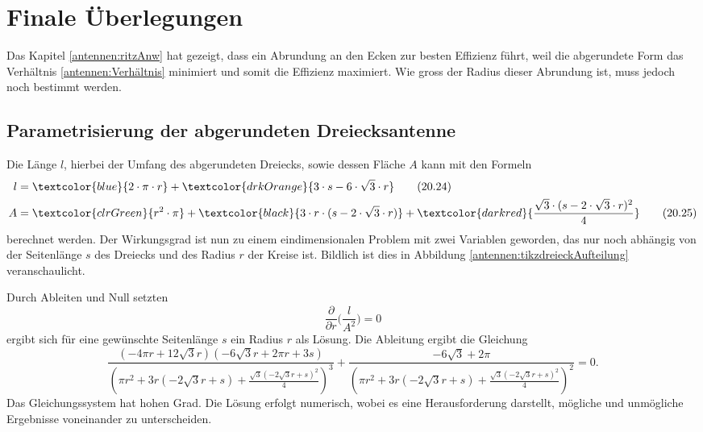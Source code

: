 %
%
% 
%
%
\section{Finale Überlegungen\label{antennen:resultat}}
Das Kapitel \ref{antennen:ritzAnw} hat gezeigt, dass ein Abrundung an den Ecken
zur besten Effizienz führt, weil die abgerundete Form das Verhältnis \eqref{antennen:Verhältnis}
minimiert und somit die Effizienz maximiert. Wie gross der Radius dieser Abrundung
ist, muss jedoch noch bestimmt werden.


\subsection{Parametrisierung der abgerundeten Dreiecksantenne\label{antennen:param3eck}}
Die Länge $l$, hierbei der Umfang 
des abgerundeten Dreiecks, sowie dessen Fläche $A$ kann mit den Formeln
\begin{align}
	l &= \textcolor{blue}{2 \cdot \pi \cdot r} + \textcolor{drkOrange}{3 \cdot s - 6 \cdot \sqrt{3} \cdot r} \tag{20.24} \label{antennen:Länge} \\
	A &= \textcolor{clrGreen}{r^2 \cdot \pi} + \textcolor{black}{3 \cdot r \cdot (s - 2 \cdot \sqrt{3} \cdot r)} + \textcolor{darkred}{\frac{\sqrt{3} \cdot (s - 2 \cdot \sqrt{3} \cdot r)^2}{4}} \tag{20.25} \label{antennen:Fläche}
\end{align}\setcounter{equation}{25}%
berechnet werden.
Der Wirkungsgrad ist nun zu einem eindimensionalen Problem mit zwei Variablen geworden, das nur noch abhängig von 
der Seitenlänge $s$ des Dreiecks und des Radius $r$ der Kreise ist. Bildlich ist dies 
in Abbildung \ref{antennen:tikzdreieckAufteilung} veranschaulicht.


Durch Ableiten und Null setzten
\begin{equation}
	\frac{\partial}{\partial{r}} \bigg(\frac{l}{A^2}\bigg)=0
	\label{antennen:Ableitung}
\end{equation}
ergibt sich für eine gewünschte Seitenlänge $s$ ein Radius $r$ als Lösung. 
Die Ableitung ergibt die Gleichung 
\begin{equation}
	\frac{(- 4 \pi r + 12 \sqrt{3} r) (- 6 \sqrt{3} r + 2 \pi r + 3 s)}{\left(\pi r^{2} + 3 r (- 2 \sqrt{3} r + s) + \frac{\sqrt{3} \left(- 2 \sqrt{3} r + s\right)^{2}}{4}\right)^{3}} + \frac{- 6 \sqrt{3} + 2 \pi}{\left(\pi r^{2} + 3 r (- 2 \sqrt{3} r + s) + \frac{\sqrt{3} \left(- 2 \sqrt{3} r + s\right)^{2}}{4}\right)^{2}}=0.
	\label{antennen:Ableitunggelöst}
\end{equation}
Das Gleichungssystem hat hohen Grad. Die Lösung erfolgt numerisch, 
wobei es eine Herausforderung darstellt, mögliche und unmögliche Ergebnisse voneinander zu unterscheiden.

